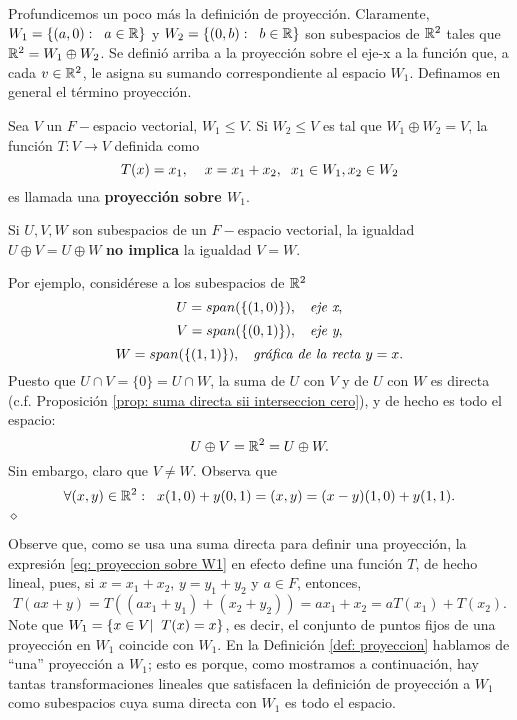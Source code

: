 Profundicemos un poco más la definición de proyección.
Claramente, $W_{1} = \{ (a, 0): \hspace{0.2cm} a \in \mathbb{R} \}$
y $W_{2} = \{ (0, b): \hspace{0.2cm} b \in \mathbb{R} \}$
son subespacios de $\mathbb{R}^{2}$ tales que 
$\mathbb{R}^{2} = W_{1} \oplus W_{2}$. Se definió arriba a la proyección
sobre el eje-x a la función que, a cada $v \in \mathbb{R}^{2}$, le 
asigna su sumando correspondiente al espacio $W_{1}$.
Definamos en general el término proyección.
\begin{defi}
	\label{def: proyeccion}
Sea $V$ un $F-$espacio vectorial, $W_{1} \leq V$.
Si $W_{2} \leq V$ es tal que $W_{1} \oplus W_{2} = V$, 
la función $T: V \longrightarrow V$ definida como
\begin{equation}
	\label{eq: proyeccion sobre W1}
	T(x) = x_{1}, \hspace{0.4cm}
x = x_{1} + x_{2}, \hspace{0.2cm}
x_{1} \in W_{1}, x_{2} \in W_{2}
\end{equation}
es llamada
una \textbf{proyección sobre $W_{1}$}.
\end{defi}

\begin{nota}
	Si $U, V, W$ son subespacios de
	un $F-$espacio vectorial, la igualdad $U \oplus V = U \oplus W$ 
	\textbf{no implica} la igualdad $V = W$.
	
	Por ejemplo, considérese a los subespacios de $\mathbb{R}^{2}$
	\[
	U = span(\{(1, 0)\}), \hspace{0.2cm} \textit{ eje x},
	\]
	\[
	V = span(\{(0, 1)\}), \hspace{0.2cm} \textit{ eje y},
	\]
	\[
	W = span(\{(1, 1)\}), \hspace{0.2cm} \textit{ gráfica de la recta $y = x$}.
	\]
	Puesto que $U \cap V = \{0\} = U \cap W$, la suma de $U$ con 
	$V$ y de $U$ con $W$ es directa (c.f. Proposición
	\ref{prop: suma directa sii interseccion cero}), y de hecho es todo el espacio:
	\[
	U \oplus V = \mathbb{R}^{2} = U \oplus W.
	\]
	Sin embargo, claro que $V \neq W$. 
	Observa que 
	\[
	\forall (x, y) \in \mathbb{R}^{2}: \hspace{0.2cm}
	x (1, 0) + y (0, 1) = (x, y) = (x-y) (1, 0) + y(1, 1).
	\]
	$\diamond$
\end{nota}


Observe que, como se usa una suma directa para
definir una proyección, la expresión
\eqref{eq: proyeccion sobre W1}
en efecto define una función $T$, de hecho lineal, pues,
si $x = x_{1} + x_{2}$, $y = y_{1} + y_{2}$ y $a \in F$,
entonces,
\[
T(ax + y) = 
T((ax_{1} + y_{1}) + (x_{2}+y_{2}))
= ax_{1} + x_{2} =
a T(x_{1}) + T(x_{2}).
\] 
Note que $W_{1} = \{ x \in V  | \hspace{0.2cm} T(x) = x \}$,
es decir, el conjunto de puntos fijos de una proyección
en $W_{1}$ coincide con $W_{1}$. 
En la Definición \ref{def: proyeccion}
hablamos de ``una'' proyección a $W_{1}$; esto es porque, 
como mostramos a continuación, hay tantas
transformaciones lineales que satisfacen la 
definición de proyección
a $W_{1}$ como subespacios cuya suma directa
con $W_{1}$ es todo el espacio.

